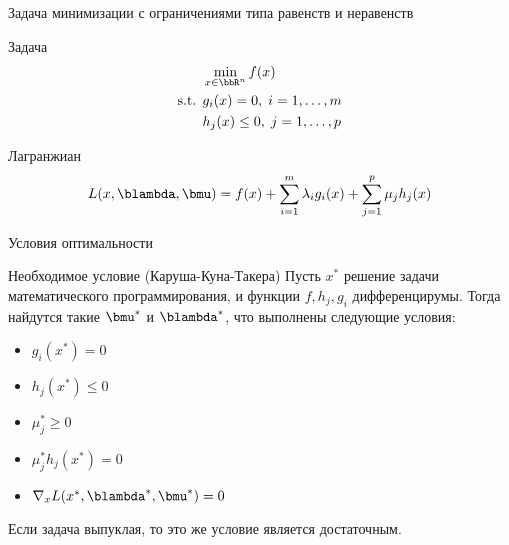 \documentclass[12pt]{beamer}
\begin{document}
\begin{frame}{{\small Задача минимизации с ограничениями типа равенств и неравенств}}

\begin{block}{Задача}
\vspace{-5mm}
\begin{equation*}
\begin{split}
& \min\limits_{x \in \bbR^n} f(x)\\
\text{s.t. } & g_i(x) = 0, \; i = 1,\ldots,m\\
& h_j(x) \leq 0, \; j = 1,\ldots, p
\end{split}
\end{equation*}
\end{block}

\begin{block}{Лагранжиан}
\begin{equation*}
L(x, \blambda, \bmu) = f(x) + \sum\limits_{i=1}^m\lambda_i g_i(x) + \sum\limits_{j=1}^p \mu_j h_j(x)
\end{equation*}
\end{block}
\end{frame}

\begin{frame}{Условия оптимальности}
\begin{block}{Необходимое условие (Каруша-Куна-Такера)}
Пусть $x^*$ решение задачи математического программирования, и функции $f, h_j, g_i$ дифференцирумы. 
Тогда найдутся такие $\bmu^*$ и $\blambda^*$, что выполнены следующие условия:
\begin{itemize}
\item $g_i(x^*) = 0$
\item $h_j(x^*) \leq 0$
\item $ \mu^*_j \geq 0$
\item $\mu^*_jh_j(x^*) = 0$
\item $\nabla_x L(x^*, \blambda^*, \bmu^*) = 0$
\end{itemize}
\end{block}
Если задача выпуклая, то это же условие является достаточным.
\end{frame}
\end{document}

